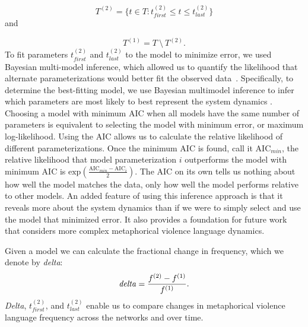 \[ T^{(2)} = \{t \in T: t_{first}^{(2)} \leq t \leq t_{last}^{(2)} \} \]
\noindent and 

\[ T^{(1)} = T~\setminus~T^{(2)}.  \] \noindent To fit parameters
$t_{first}^{(2)}$ and $t_{last}^{(2)}$ to the model to minimize error, we used
Bayesian multi-model inference, which allowed us to quantify the likelihood that
alternate parameterizations would better fit the observed
data~\cite{Burnham2011}. Specifically, to determine the best-fitting model, we
use Bayesian multimodel inference to infer which parameters are most likely to
best represent the system dynamics \cite{Burnham2011}.  Choosing a model with
minimum AIC when all models have the same number of parameters is equivalent to
selecting the model with minimum error, or maximum log-likelihood. Using the AIC
allows us to calculate the relative likelihood of different parameterizations.
Once the minimum AIC is found, call it $\text{AIC}_{min}$, the relative
likelihood that model parameterization $i$ outperforms the model with minimum
AIC is $\text{exp}(\frac{\text{AIC}_{min} - \text{AIC}_i}{2})$. The AIC on
its own tells us nothing about how well the model matches the data, only  how
well the model performs relative to other models. An added feature of using this
inference approach is that it reveals more about the system dynamics than if we
were to simply select and use the  model that minimized error. It also provides
a foundation for future work that considers more complex metaphorical violence
language dynamics. 

Given a model we can calculate the fractional change in frequency, which we
denote by \emph{delta}: 
\begin{equation} 
  \text{\emph{delta}} = \frac{f^{(2)} - f^{(1)}}{f^{(1)}}.  
  \label{eq:delta} 
\end{equation} 
\noindent \emph{Delta},
$t^{(2)}_{first}$, and $t^{(2)}_{last}$ enable us to compare changes in
metaphorical violence language frequency across the networks and over time.
